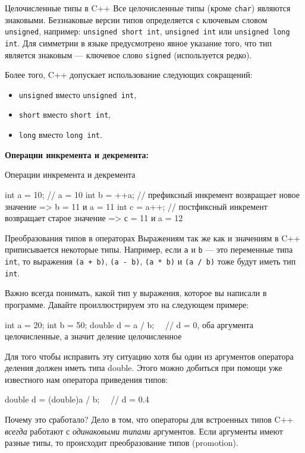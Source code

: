 \documentclass[9pt]{beamer}
\begin{document}
\begin{frame}{Целочисленные типы в C++}
    Все целочисленные типы (кроме \texttt{char}) являются знаковыми. Беззнаковые версии типов определяется с ключевым словом \texttt{unsigned}, например: \texttt{unsigned short int}, \texttt{unsigned int} или \texttt{unsigned long int}. Для симметрии в языке предусмотрено явное указание того, что тип является знаковым — ключевое слово \texttt{signed} (используется редко).
    
    Более того, C++ допускает использование следующих сокращений:
    \begin{itemize}
        \item \texttt{unsigned} вместо \texttt{unsigned int},
        \item \texttt{short} вместо \texttt{short int},
        \item \texttt{long} вместо \texttt{long int}.
    \end{itemize}

    \textbf{Операции инкремента и декремента:}
\end{frame}

\begin{frame}[fragile]{Операции инкремента и декремента}
    \begin{cppcode}
        int a = 10; // a = 10
        int b = ++a; // префиксный инкремент возвращает новое значение => b = 11 и a = 11
        int c = a++; // постфиксный инкремент возвращает старое значение => с = 11 и a = 12
    \end{cppcode}
\end{frame}

\begin{frame}[fragile]{Преобразования типов в операторах}
    Выражениям так же как и значениям в C++ приписывается некоторые типы. Например, если \texttt{a} и \texttt{b} — это переменные типа \texttt{int}, то выражения \texttt{(a + b)}, \texttt{(a - b)}, \texttt{(a * b)} и \texttt{(a / b)} тоже будут иметь тип \texttt{int}.
    
    Важно всегда понимать, какой тип у выражения, которое вы написали в программе. Давайте проиллюстрируем это на следующем примере:
    
    \begin{cppcode}
        int a = 20;
        int b = 50;
        double d = a / b;  // d = 0, оба аргумента целочисленные, а значит деление целочисленное 
    \end{cppcode}

    Для того чтобы исправить эту ситуацию хотя бы один из аргументов оператора деления должен иметь типа double. Этого можно добиться при помощи уже известного нам оператора приведения типов:
    \begin{cppcode}
        double d = (double)a / b;  // d = 0.4
    \end{cppcode}

    Почему это сработало? Дело в том, что операторы для встроенных типов C++ \emph{всегда} работают с \emph{одинаковыми типами} аргументов. Если аргументы имеют разные типы, то происходит преобразование типов (promotion).
\end{frame}
\end{document}
